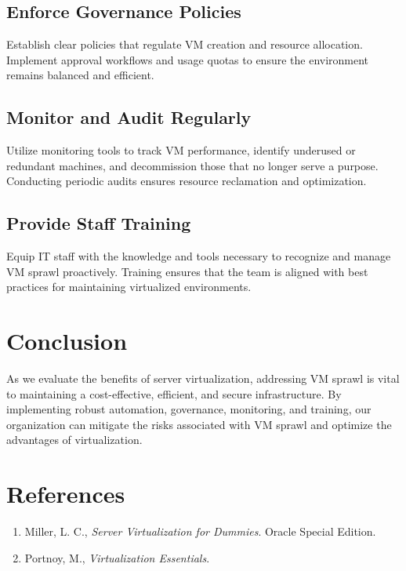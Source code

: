 \documentclass[11pt,a4paper,twocolumn]{article}
\begin{document}
\subsection{Enforce Governance Policies}
Establish clear policies that regulate VM creation and resource allocation. Implement approval workflows and usage quotas to ensure the environment remains balanced and efficient.

\subsection{Monitor and Audit Regularly}
Utilize monitoring tools to track VM performance, identify underused or redundant machines, and decommission those that no longer serve a purpose. Conducting periodic audits ensures resource reclamation and optimization.

\subsection{Provide Staff Training}
Equip IT staff with the knowledge and tools necessary to recognize and manage VM sprawl proactively. Training ensures that the team is aligned with best practices for maintaining virtualized environments.

\section{Conclusion}
As we evaluate the benefits of server virtualization, addressing VM sprawl is vital to maintaining a cost-effective, efficient, and secure infrastructure. By implementing robust automation, governance, monitoring, and training, our organization can mitigate the risks associated with VM sprawl and optimize the advantages of virtualization.

\section{References}
\begin{enumerate}
    \item Miller, L. C., \emph{Server Virtualization for Dummies}. Oracle Special Edition.
    \item Portnoy, M., \emph{Virtualization Essentials}.
\end{enumerate}
\end{document}

